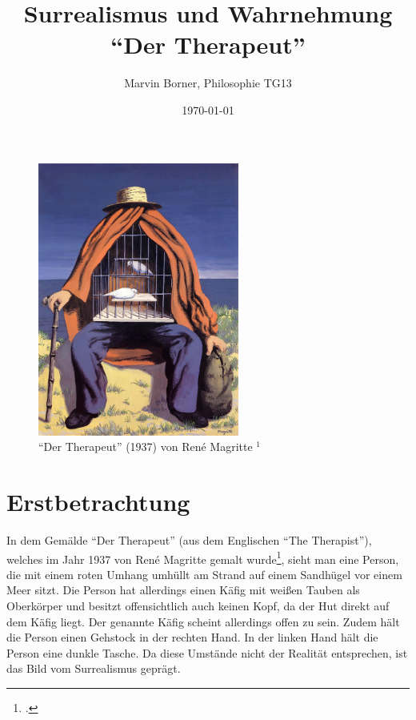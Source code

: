 \documentclass[a4paper, 12pt]{article}
\begin{document}
\title{\vspace{-2.0cm}Surrealismus und Wahrnehmung\\\enquote{Der Therapeut}}
\author{Marvin Borner, Philosophie TG13}
\date{\today}

%

\maketitle

\begin{figure}[H]
	\centering
	\includegraphics[height=9cm]{the-therapist}
	\caption{\enquote{Der Therapeut} (1937) von René Magritte $^1$}
\end{figure}

\section{Erstbetrachtung}
In dem Gemälde \enquote{Der Therapeut} (aus dem Englischen \enquote{The Therapist}), welches im Jahr 1937 von René Magritte gemalt wurde\footcite{therapist}, sieht man eine Person, die mit einem roten Umhang umhüllt am Strand auf einem Sandhügel vor einem Meer sitzt. Die Person hat allerdings einen Käfig mit weißen Tauben als Oberkörper und besitzt offensichtlich auch keinen Kopf, da der Hut direkt auf dem Käfig liegt. Der genannte Käfig scheint allerdings offen zu sein. Zudem hält die Person einen Gehstock in der rechten Hand. In der linken Hand hält die Person eine dunkle Tasche. Da diese Umstände nicht der Realität entsprechen, ist das Bild vom Surrealismus geprägt.
\end{document}
